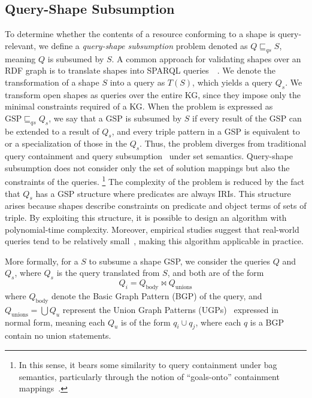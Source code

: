 \subsection{Query-Shape Subsumption}\label{sec:containment}

To determine whether the contents of a resource conforming to a shape is query-relevant, we define a \emph{query-shape subsumption} problem denoted as $Q \sqsubseteq_{qs} S$, meaning $Q$ is subsumed by $S$.
A common approach for validating shapes over an RDF graph is to translate shapes into SPARQL queries~~\cite{labragayo2017validatingdescribinglinkeddata, Corman2019, spapeExpressionConvert, delva2023}.
We denote the transformation of a shape $S$ into a query as $T(S)$, which yields a query $Q_s$.
We transform open shapes as queries over the entire KG, since they impose only the minimal constraints required of a KG.
When the problem is expressed as $\text{GSP} \sqsubseteq_{qs} Q_s$, we say that a GSP is subsumed by $S$ if every result of the GSP can be extended to a result of $Q_s$, and every triple pattern in a GSP is equivalent to or a specialization of those in the $Q_s$.
Thus, the problem diverges from traditional query containment and query subsumption~\cite{Spasi2023, Pichler2014} under set semantics. 
Query-shape subsumption does not consider only the set of solution mappings but also the constraints of the queries.
\footnote{In this sense, it bears some similarity to query containment under bag semantics, particularly through the notion of ``goals-onto'' containment mappings~\cite{Chaudhuri1993, Afrati2010}.} 
The complexity of the problem is reduced by the fact that $Q_s$ has a GSP structure where predicates are always IRIs.
This structure arises because shapes describe constraints on predicate and object terms of sets of triple.
By exploiting this structure, it is possible to design an algorithm with polynomial-time complexity.
Moreover, empirical studies suggest that real-world queries tend to be relatively small~\cite{Doan2012, Bonifati2019}, making this algorithm applicable in practice.

More formally, for a $S$ to subsume a shape GSP, we consider the queries $Q$ and $Q_s$, where $Q_s$ is the query translated from $S$, and both are of the form 
$$
Q_i = Q_{\text{body}} \bowtie Q_{\text{unions}}
$$
where $Q_{\text{body}}$ denote the Basic Graph Pattern (BGP) of the query, and 
$Q_{\text{unions}} = \bigcup Q_u$ represent the Union Graph Patterns (UGPs)~\cite{w3SPARQLQuery} expressed in normal form, meaning 
each $Q_u$ is of the form $q_i \cup q_j$, where each $q$ is a BGP contain no union statements.

